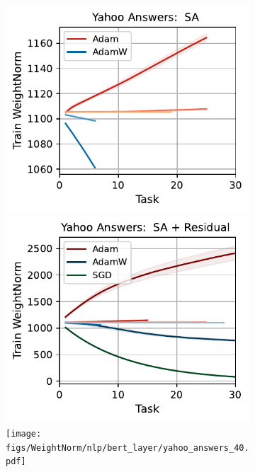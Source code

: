 \begin{figure}[htb!]
{\begin{figure}[htb!]
{        \includegraphics[width=\textwidth]{figs/WeightNorm/nlp/attention/yahoo_answers_40.pdf}
        \includegraphics[width=\textwidth]{figs/WeightNorm/nlp/attention_residual/yahoo_answers_40.pdf}
        \texttt{[image: figs/WeightNorm/nlp/bert\_layer/yahoo\_answers\_40.pdf]}
    }\\    \resizebox{\textwidth}{!}{
}
\end{figure}}
\end{figure}

